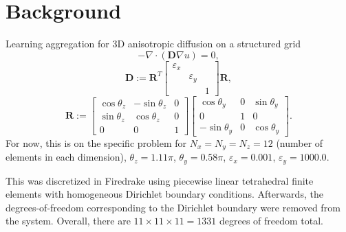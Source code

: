 \documentclass{article}
\newcommand{\mat}[1]{\bm{{#1}}}
\newcommand{\grad}{\nabla}
\begin{document}
\section{Background}
Learning aggregation for 3D anisotropic diffusion on a structured grid
\begin{equation}
  -\grad \cdot \left(\mat{D} \grad u\right) = 0,
\end{equation}
\begin{equation}
  \mat{D} := \mat{R}^T\begin{bmatrix}\varepsilon_x & & \\ & \varepsilon_y & \\ & & 1 \end{bmatrix}\mat{R},
\end{equation}
\begin{equation}
  \mat{R} := \begin{bmatrix} \cos \theta_z & -\sin \theta_z & 0 \\ \sin \theta_z & \cos \theta_z & 0 \\ 0 & 0 & 1\end{bmatrix} \begin{bmatrix}\cos \theta_y & 0 & \sin \theta_y \\ 0 & 1 & 0 \\ -\sin\theta_y & 0 & \cos\theta_y \end{bmatrix}.
\end{equation}
For now, this is on the specific problem for $N_x=N_y=N_z=12$ (number of elements in each dimension), $\theta_z=1.11\pi$, $\theta_y=0.58\pi$, $\varepsilon_x=0.001$, $\varepsilon_y=1000.0$.

This was discretized in Firedrake \cite{Firedrake} using piecewise linear tetrahedral finite elements with homogeneous Dirichlet boundary conditions.  Afterwards, the degrees-of-freedom corresponding to the Dirichlet boundary were removed from the system.  Overall, there are $11 \times 11 \times 11 = 1331$ degrees of freedom total.
\end{document}
